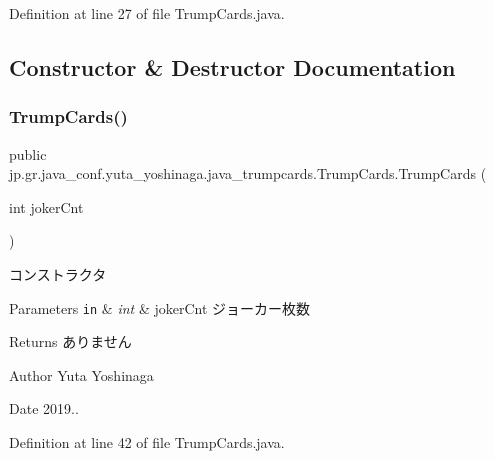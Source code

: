 Definition at line 27 of file Trump\+Cards.\+java.



\subsection{Constructor \& Destructor Documentation}
\mbox{\label{classjp_1_1gr_1_1java__conf_1_1yuta__yoshinaga_1_1java__trumpcards_1_1_trump_cards_aa72c9dd291a7af6a879f7d501debe4cd}} 
\subsubsection{\texorpdfstring{Trump\+Cards()}{TrumpCards()}}
{\footnotesize\ttfamily public jp.\+gr.\+java\+\_\+conf.\+yuta\+\_\+yoshinaga.\+java\+\_\+trumpcards.\+Trump\+Cards.\+Trump\+Cards (\begin{DoxyParamCaption}\item[{int}]{joker\+Cnt }\end{DoxyParamCaption})}



コンストラクタ 


\begin{DoxyParams}[1]{Parameters}
\mbox{\tt in}  & {\em int} & joker\+Cnt ジョーカー枚数 \\
\hline
\end{DoxyParams}
\begin{DoxyReturn}{Returns}
ありません 
\end{DoxyReturn}
\begin{DoxyAuthor}{Author}
Yuta Yoshinaga 
\end{DoxyAuthor}
\begin{DoxyDate}{Date}
2019.. 
\end{DoxyDate}


Definition at line 42 of file Trump\+Cards.\+java.

